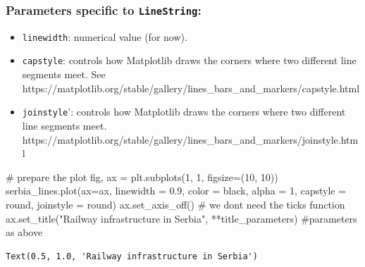 \documentclass[
  letterpaper,
  DIV=11,
  numbers=noendperiod]{scrreprt}
\newenvironment{Shaded}{\begin{snugshade}}{\end{snugshade}}
\newcommand{\CommentTok}[1]{\textcolor[rgb]{0.37,0.37,0.37}{#1}}
\newcommand{\DecValTok}[1]{\textcolor[rgb]{0.68,0.00,0.00}{#1}}
\newcommand{\FloatTok}[1]{\textcolor[rgb]{0.68,0.00,0.00}{#1}}
\newcommand{\NormalTok}[1]{\textcolor[rgb]{0.00,0.23,0.31}{#1}}
\newcommand{\OperatorTok}[1]{\textcolor[rgb]{0.37,0.37,0.37}{#1}}
\newcommand{\StringTok}[1]{\textcolor[rgb]{0.13,0.47,0.30}{#1}}
\providecommand{\tightlist}{%
  \setlength{\itemsep}{0pt}\setlength{\parskip}{0pt}}\usepackage{longtable,booktabs,array}
\begin{document}
\hypertarget{parameters-specific-to-linestring}{%
\subsubsection{\texorpdfstring{Parameters specific to
\texttt{LineString}:}{Parameters specific to LineString:}}\label{parameters-specific-to-linestring}}

\begin{itemize}
\tightlist
\item
  \texttt{linewidth}: numerical value (for now).
\item
  \texttt{capstyle}: controls how Matplotlib draws the corners where two
  different line segments meet. See
  https://matplotlib.org/stable/gallery/lines\_bars\_and\_markers/capstyle.html
\item
  \texttt{joinstyle}': controls how Matplotlib draws the corners where
  two different line segments meet.
  https://matplotlib.org/stable/gallery/lines\_bars\_and\_markers/joinstyle.html
\end{itemize}

\begin{Shaded}
\begin{Highlighting}[]
\CommentTok{\# prepare the plot}
\NormalTok{fig, ax }\OperatorTok{=}\NormalTok{ plt.subplots(}\DecValTok{1}\NormalTok{, }\DecValTok{1}\NormalTok{, figsize}\OperatorTok{=}\NormalTok{(}\DecValTok{10}\NormalTok{, }\DecValTok{10}\NormalTok{))}
\NormalTok{serbia\_lines.plot(ax}\OperatorTok{=}\NormalTok{ax, linewidth }\OperatorTok{=} \FloatTok{0.9}\NormalTok{, color }\OperatorTok{=} \StringTok{\textquotesingle{}black\textquotesingle{}}\NormalTok{, alpha }\OperatorTok{=} \DecValTok{1}\NormalTok{, capstyle }\OperatorTok{=} \StringTok{\textquotesingle{}round\textquotesingle{}}\NormalTok{, joinstyle }\OperatorTok{=} \StringTok{\textquotesingle{}round\textquotesingle{}}\NormalTok{)}
\NormalTok{ax.set\_axis\_off() }\CommentTok{\# we don\textquotesingle{}t need the ticks function}
\NormalTok{ax.set\_title(}\StringTok{"Railway infrastructure in Serbia"}\NormalTok{, }\OperatorTok{**}\NormalTok{title\_parameters) }\CommentTok{\#parameters as above}
\end{Highlighting}
\end{Shaded}

\begin{verbatim}
Text(0.5, 1.0, 'Railway infrastructure in Serbia')
\end{verbatim}
\end{document}
